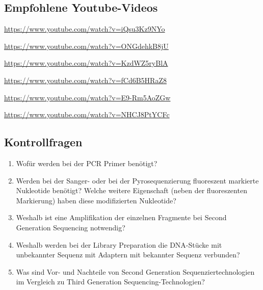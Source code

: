 \subsection{Empfohlene Youtube-Videos}
\begin{description}[align=left]
	\item [PCR] \href{https://www.youtube.com/watch?v=iQsu3Kz9NYo}{https://www.youtube.com/watch?v=iQsu3Kz9NYo}
	\item [Sanger-Sequenzierung] \href{https://www.youtube.com/watch?v=ONGdehkB8jU}{https://www.youtube.com/watch?v=ONGdehkB8jU}
	\item [454-Sequenzierung] \href{https://www.youtube.com/watch?v=KzdWZ5ryBlA}{https://www.youtube.com/watch?v=KzdWZ5ryBlA}
	\item [Illumina-Sequenzierung] \href{https://www.youtube.com/watch?v=fCd6B5HRaZ8}{https://www.youtube.com/watch?v=fCd6B5HRaZ8}
	\item [Nanopore-Sequenzierung] \href{https://www.youtube.com/watch?v=E9-Rm5AoZGw}{https://www.youtube.com/watch?v=E9-Rm5AoZGw}
	\item [SMRT-Sequenzierung] \href{https://www.youtube.com/watch?v=NHCJ8PtYCFc}{https://www.youtube.com/watch?v=NHCJ8PtYCFc}
\end{description}

\subsection{Kontrollfragen}
\begin{enumerate}
	\item Wofür werden bei der PCR Primer benötigt?
	\item Werden bei der Sanger- oder bei der Pyrosequenzierung fluoreszent markierte Nukleotide benötigt? Welche weitere Eigenschaft (neben der fluoreszenten Markierung) haben diese modifizierten Nukleotide?
	\item Weshalb ist eine Amplifikation der einzelnen Fragmente bei Second Generation Sequencing notwendig?
	\item Weshalb werden bei der Library Preparation die DNA-Stücke mit unbekannter Sequenz mit Adaptern mit bekannter Sequenz verbunden?
	\item Was sind Vor- und Nachteile von Second Generation Sequenziertechnologien im Vergleich zu Third Generation Sequencing-Technologien?
\end{enumerate}
